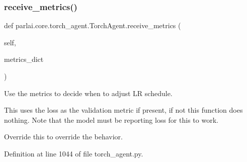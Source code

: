 \subsubsection{\texorpdfstring{receive\+\_\+metrics()}{receive\_metrics()}}
{\footnotesize\ttfamily def parlai.\+core.\+torch\+\_\+agent.\+Torch\+Agent.\+receive\+\_\+metrics (\begin{DoxyParamCaption}\item[{}]{self,  }\item[{}]{metrics\+\_\+dict }\end{DoxyParamCaption})}

\begin{DoxyVerb}Use the metrics to decide when to adjust LR schedule.

This uses the loss as the validation metric if present, if not this
function does nothing. Note that the model must be reporting loss for
this to work.

Override this to override the behavior.
\end{DoxyVerb}
 

Definition at line 1044 of file torch\+\_\+agent.\+py.


